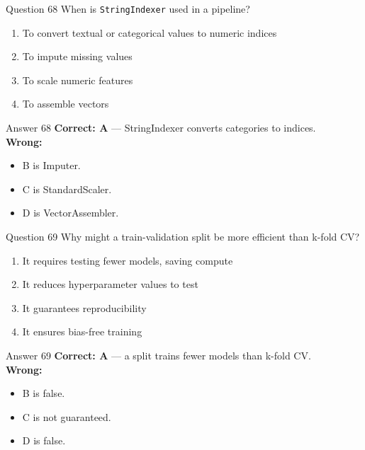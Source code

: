 \documentclass[aspectratio=169,11pt]{beamer}
\begin{document}
	\begin{frame}{Question 68}
		When is \texttt{StringIndexer} used in a pipeline?
		\begin{enumerate}[label=\Alph*.]
			\item To convert textual or categorical values to numeric indices
			\item To impute missing values
			\item To scale numeric features
			\item To assemble vectors
		\end{enumerate}
	\end{frame}
	\begin{frame}{Answer 68}
		\textbf{Correct: A} --- StringIndexer converts categories to indices.\\
		\vspace{0.5em}
		\textbf{Wrong:}
		\begin{itemize}
			\item B is Imputer.
			\item C is StandardScaler.
			\item D is VectorAssembler.
		\end{itemize}
	\end{frame}
	
	\begin{frame}{Question 69}
		Why might a train-validation split be more efficient than k-fold CV?
		\begin{enumerate}[label=\Alph*.]
			\item It requires testing fewer models, saving compute
			\item It reduces hyperparameter values to test
			\item It guarantees reproducibility
			\item It ensures bias-free training
		\end{enumerate}
	\end{frame}
	\begin{frame}{Answer 69}
		\textbf{Correct: A} --- a split trains fewer models than k-fold CV.\\
		\vspace{0.5em}
		\textbf{Wrong:}
		\begin{itemize}
			\item B is false.
			\item C is not guaranteed.
			\item D is false.
		\end{itemize}
	\end{frame}
	
\end{document}
